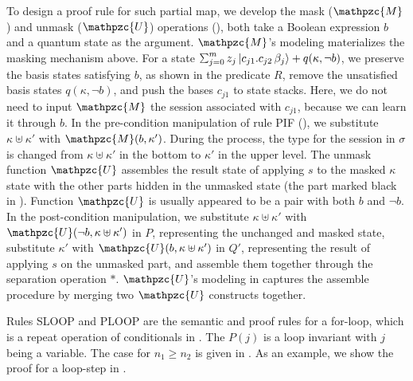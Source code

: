To design a proof rule for such partial map, we develop the mask ($\mathpzc{M}$) and unmask ($\mathpzc{U}$) operations (), both take a Boolean expression $b$ and a quantum state as the argument. $\mathpzc{M}$'s modeling materializes the masking mechanism above. For a state $\sch{m}{z_j}{c_{j1}.c_{j2}\,\beta_j}+q(\kappa,\neg b)$, we preserve the basis states satisfying $b$, as shown in the predicate $R$, remove the unsatisfied basis states $q(\kappa,\neg b)$, and push the bases $c_{j1}$ to state stacks.
Here, we do not need to input $\mathpzc{M}$ the session associated with $c_{j1}$, because we can learn it through $b$.
In the pre-condition manipulation of rule \textsc{PIF} (), we substitute $\kappa \uplus \kappa'$ with $\mathpzc{M}(b,\kappa')$. During the process, the type for the session in $\sigma$ is changed from $\kappa \uplus \kappa'$ in the bottom to $\kappa'$ in the upper level.
The unmask function $\mathpzc{U}$ assembles the result state of applying $s$ to the masked $\kappa$ state with the other parts hidden in the unmasked state (the part marked black in ). Function $\mathpzc{U}$ is usually appeared to be a pair with both $b$ and $\neg b$. In the post-condition manipulation, we substitute $\kappa \uplus \kappa'$ with $\mathpzc{U}(\neg b,\kappa \uplus \kappa')$ in $P$, representing the unchanged and masked state, substitute $\kappa'$ with $\mathpzc{U}(b,\kappa \uplus \kappa')$ in $Q'$, representing the result of applying $s$ on the unmasked part, and assemble them together through the separation operation $*$.
$\mathpzc{U}$'s modeling in  captures the assemble procedure by merging two $\mathpzc{U}$ constructs together.

Rules \textsc{SLOOP} and \textsc{PLOOP} are the semantic and proof rules for a for-loop, which is a repeat operation of conditionals in \qafny. The $P(j)$ is a loop invariant with $j$ being a variable. The case for $n_1 \ge n_2$ is given in . As an example, we show the proof for a loop-step in .

